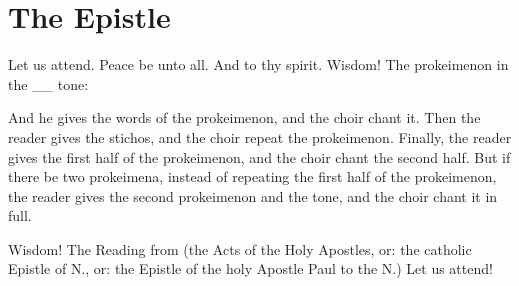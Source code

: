 \section{The Epistle}

\begin{liturgicaltext}
    \deacon Let us attend.
    \priest Peace be unto all.
    \reader And to thy spirit.
    \deacon Wisdom!
    \reader The prokeimenon in the \_\_ tone:
\end{liturgicaltext}
\begin{rubricmed}
    And he gives the words of the prokeimenon, and the choir chant it. Then the reader gives the stichos, and the choir repeat the prokeimenon. Finally, the reader gives the first half of the prokeimenon, and the choir chant the second half. But if there be two prokeimena, instead of repeating the first half of the prokeimenon, the reader gives the second prokeimenon and the tone, and the choir chant it in full.
\end{rubricmed}
\begin{liturgicaltext}
    \deacon Wisdom!
    \reader The Reading from (the Acts of the Holy Apostles, or: the catholic Epistle of N., or: the Epistle of the holy Apostle Paul to the N.)
    \deacon Let us attend!
    \reader {}
\end{liturgicaltext}

